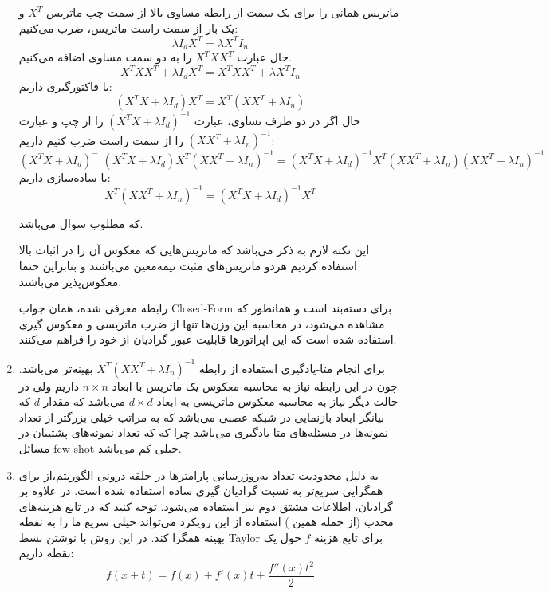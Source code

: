 \documentclass{article}
\begin{document}
\begin{enumerate}
	ماتریس همانی را برای یک سمت از رابطه مساوی بالا از سمت چپ ماتریس 
	${X^T}$
	و یک بار از سمت راست ماتریس،‌ ضرب می‌کنیم:
	$$
	\lambda {I_d}{X^T} = \lambda {X^T}{I_n}
	$$
	حال عبارت
	${X^T}X{X^T}$
	را به دو سمت مساوی اضافه می‌کنیم.
	$$
	{X^T}X{X^T} + \lambda {I_d}{X^T} = {X^T}X{X^T} + \lambda {X^T}{I_n}
	$$
	با فاکتورگیری داریم:
	$$
	\left( {{X^T}X + \lambda {I_d}} \right){X^T} = {X^T}\left( {X{X^T} + \lambda {I_n}} \right)
	$$
	حال اگر در دو طرف تساوی، عبارت
	${\left( {{X^T}X + \lambda {I_d}} \right)^{ - 1}}$
	را از چپ و عبارت
	${\left( {X{X^T} + \lambda {I_n}} \right)^{ - 1}}$
	را از سمت راست ضرب کنیم داریم:
	$$
	{\left( {{X^T}X + \lambda {I_d}} \right)^{ - 1}}\left( {{X^T}X + \lambda {I_d}} \right){X^T}{\left( {X{X^T} + \lambda {I_n}} \right)^{ - 1}} = {\left( {{X^T}X + \lambda {I_d}} \right)^{ - 1}}{X^T}\left( {X{X^T} + \lambda {I_n}} \right){\left( {X{X^T} + \lambda {I_n}} \right)^{ - 1}}
	$$
	با ساده‌سازی داریم:
	$$
	{X^T}{\left( {X{X^T} + \lambda {I_n}} \right)^{ - 1}} = {\left( {{X^T}X + \lambda {I_d}} \right)^{ - 1}}{X^T}
	$$
	
	که مطلوب سوال می‌باشد. 
	
		این نکته لازم به ذکر می‌باشد که ماتریس‌هایی که معکوس آن را در اثبات بالا استفاده کردیم هردو ماتریس‌های مثبت نیمه‌معین می‌باشند و بنابراین حتما معکوس‌پذیر می‌باشند.
	
	رابطه معرفی شده، همان جواب Closed-Form برای دسته‌بند 
	است و همانطور که مشاهده می‌شود، در محاسبه این وزن‌ها تنها از ضرب ماتریسی و معکوس گیری استفاده شده است که این‌ اپراتورها قابلیت عبور گرادیان از خود را فراهم می‌کنند.
	
\item
	
	برای انجام متا-یادگیری استفاده از رابطه
	${X^T}{\left( {X{X^T} + \lambda {I_n}} \right)^{ - 1}}$
	بهینه‌تر می‌باشد. چون در این رابطه نیاز به محاسبه معکوس یک ماتریس با ابعاد
	$n \times n$
	داریم ولی در حالت دیگر نیاز به محاسبه معکوس ماتریسی به ابعاد
	$d \times d$
	می‌باشد که مقدار $d$ که بیانگر ابعاد بازنمایی در شبکه عصبی می‌باشد که به مراتب خیلی بزرگتر از تعداد نمونه‌ها در مسئله‌های متا-یادگیری می‌باشد چرا که که تعداد نمونه‌های پشتیبان در مسائل few-shot خیلی کم می‌باشد.
	
	\item
	به دلیل محدودیت تعداد به‌روزرسانی پارامترها در حلقه درونی الگوریتم،‌از
	برای همگرایی سریع‌تر به نسبت گرادیان گیری ساده استفاده شده است.
	در
	علاوه بر گرادیان،‌ اطلاعات مشتق دوم نیز استفاده می‌شود. توجه کنید که در تابع هزینه‌های محدب (از جمله همین 
	)
	استفاده از این رویکرد می‌تواند خیلی سریع ما را به نقطه بهینه همگرا کند.
	در این روش با نوشتن بسط Taylor برای تابع هزینه 
	$f$
	حول یک نقطه داریم:
	$$
	f\left( {x + t} \right) = f\left( x \right) + f'\left( x \right)t + \frac{{f''\left( x \right){t^2}}}{2}
	$$
	

\end{enumerate}
\end{document}
